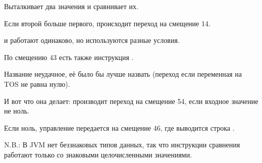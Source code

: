  Выталкивает два значения и сравнивает их.

Если второй больше первого, происходит переход на смещение 14.

 и  работают одинаково, но используются разные условия.


По смещению 43 есть также инструкция .

Название неудачное, её было бы лучше назвать  
(переход если переменная на \ac{TOS} не равна нулю).

И вот что она делает: производит переход на смещение 54, если входное значение не ноль.

Если ноль, управление передается на смещение 46, где выводится строка .


N.B.: В \ac{JVM} нет беззнаковых типов данных, так что инструкции сравнения работают
только со знаковыми целочисленными значениями.
